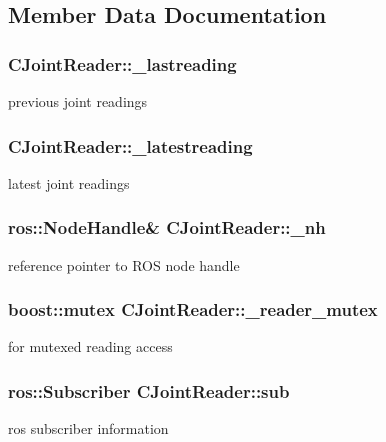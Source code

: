 \subsection{Member Data Documentation}
\hypertarget{classCJointReader_a9604ed14d6d48568b91926b63c10e9b8}{
\subsubsection[{\-\_\-lastreading}]{ C\-Joint\-Reader\-::\-\_\-lastreading}}\label{classCJointReader_a9604ed14d6d48568b91926b63c10e9b8}
previous joint readings \hypertarget{classCJointReader_aae4f2c55bb87bcf829f67728405fd4ca}{
\subsubsection[{\-\_\-latestreading}]{ C\-Joint\-Reader\-::\-\_\-latestreading}}\label{classCJointReader_aae4f2c55bb87bcf829f67728405fd4ca}
latest joint readings \hypertarget{classCJointReader_a78dffe3eb34da4198f551767919ceb4b}{
\subsubsection[{\-\_\-nh}]{\setlength{\rightskip}{0pt plus 5cm}ros\-::\-Node\-Handle\& C\-Joint\-Reader\-::\-\_\-nh}}\label{classCJointReader_a78dffe3eb34da4198f551767919ceb4b}
reference pointer to R\-O\-S node handle \hypertarget{classCJointReader_aa95e4ff986415cb2d787f32403cd3bb9}{
\subsubsection[{\-\_\-reader\-\_\-mutex}]{\setlength{\rightskip}{0pt plus 5cm}boost\-::mutex C\-Joint\-Reader\-::\-\_\-reader\-\_\-mutex\hspace{0.3cm}{\ttfamily [static]}}}\label{classCJointReader_aa95e4ff986415cb2d787f32403cd3bb9}
for mutexed reading access \hypertarget{classCJointReader_a82975d490ccc18883e1ead2ede53b13a}{
\subsubsection[{sub}]{\setlength{\rightskip}{0pt plus 5cm}ros\-::\-Subscriber C\-Joint\-Reader\-::sub}}\label{classCJointReader_a82975d490ccc18883e1ead2ede53b13a}
ros subscriber information 

